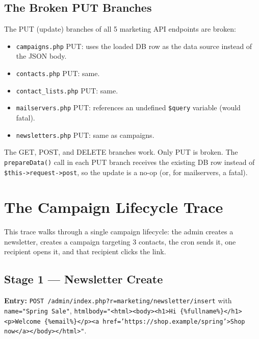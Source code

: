 \documentclass[11pt,a4paper]{article}
\begin{document}
\subsection{The Broken PUT Branches}

\begin{findingbox}
The PUT (update) branches of all 5 marketing API endpoints are
broken:

\begin{itemize}[leftmargin=1.6em,itemsep=2pt]
  \item \texttt{campaigns.php} PUT: uses the loaded DB row as the
        data source instead of the JSON body.
  \item \texttt{contacts.php} PUT: same.
  \item \texttt{contact\_lists.php} PUT: same.
  \item \texttt{mailservers.php} PUT: references an undefined
        \texttt{\$query} variable (would fatal).
  \item \texttt{newsletters.php} PUT: same as campaigns.
\end{itemize}

The GET, POST, and DELETE branches work. Only PUT is broken. The
\texttt{prepareData()} call in each PUT branch receives the
existing DB row instead of \texttt{\$this->request->post}, so
the update is a no-op (or, for mailservers, a fatal).
\end{findingbox}

\section{The Campaign Lifecycle Trace}\label{sec:trace}

This trace walks through a single campaign lifecycle: the admin
creates a newsletter, creates a campaign targeting 3 contacts,
the cron sends it, one recipient opens it, and that recipient
clicks the link.

\subsection{Stage 1 --- Newsletter Create}

\textbf{Entry:} \texttt{POST /admin/index.php?r=marketing/newsletter/insert}
with \texttt{name="Spring Sale"},
\texttt{htmlbody="<html><body><h1>Hi \{\%fullname\%\}</h1><p>Welcome \{\%email\%\}</p><a href='https://shop.example/spring'>Shop now</a></body></html>"}.
\end{document}
